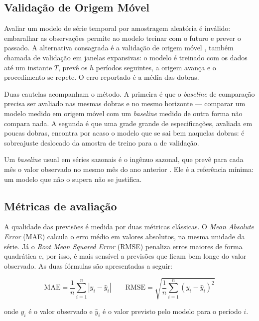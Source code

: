\subsection{Validação de Origem Móvel}
\label{subsec:origem-movel}

Avaliar um modelo de série temporal por amostragem aleatória é inválido: embaralhar as observações permite ao modelo treinar com o futuro e prever o passado. A alternativa consagrada é a validação de origem móvel \cite{Tashman2000}, também chamada de validação em janelas expansivas: o modelo é treinado com os dados até um instante $T$, prevê os $h$ períodos seguintes, a origem avança e o procedimento se repete. O erro reportado é a média das dobras.

Duas cautelas acompanham o método. A primeira é que o \textit{baseline} de comparação precisa ser avaliado nas mesmas dobras e no mesmo horizonte --- comparar um modelo medido em origem móvel com um \textit{baseline} medido de outra forma não compara nada. A segunda é que uma grade grande de especificações, avaliada em poucas dobras, encontra por acaso o modelo que se sai bem naquelas dobras: é sobreajuste deslocado da amostra de treino para a de validação.

Um \textit{baseline} usual em séries sazonais é o ingênuo sazonal, que prevê para cada mês o valor observado no mesmo mês do ano anterior \cite{Hyndman2021}. Ele é a referência mínima: um modelo que não o supera não se justifica.

\subsection{Métricas de avaliação}
\label{subsec:metricas}

A qualidade das previsões é medida por duas métricas clássicas. O \textit{Mean Absolute Error} (MAE) calcula o erro médio em valores absolutos, na mesma unidade da série. Já o \textit{Root Mean Squared Error} (RMSE) penaliza erros maiores de forma quadrática e, por isso, é mais sensível a previsões que ficam bem longe do valor observado. As duas fórmulas são apresentadas a seguir:

\begin{equation}
    \text{MAE} = \frac{1}{n}\sum_{i=1}^{n}|y_i - \hat{y}_i|
    \qquad
    \text{RMSE} = \sqrt{\frac{1}{n}\sum_{i=1}^{n}(y_i - \hat{y}_i)^2}
\end{equation}

onde $y_i$ é o valor observado e $\hat{y}_i$ é o valor previsto pelo modelo para o período $i$.

